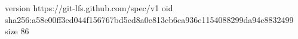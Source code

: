 version https://git-lfs.github.com/spec/v1
oid sha256:a58e00ff3ed044f156767bd5cd8a0e813cb6ca936e1154088299da94c8832499
size 86
